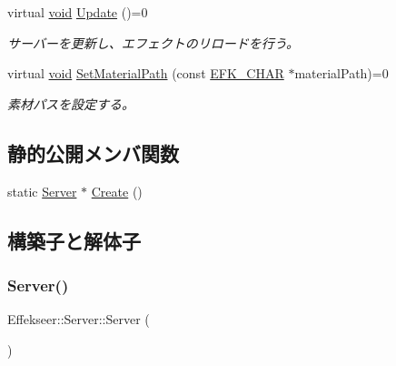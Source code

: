 \begin{DoxyCompactItemize}
virtual \mbox{\hyperlink{namespace_effekseer_ab34c4088e512200cf4c2716f168deb56}{void}} \mbox{\hyperlink{class_effekseer_1_1_server_af841f04fb41ed36b888cb2f89c4c0771}{Update}} ()=0
\begin{DoxyCompactList}\small\item\em サーバーを更新し、エフェクトのリロードを行う。 \end{DoxyCompactList}\item 
virtual \mbox{\hyperlink{namespace_effekseer_ab34c4088e512200cf4c2716f168deb56}{void}} \mbox{\hyperlink{class_effekseer_1_1_server_a4c0d31a5fd39184615179157a6929296}{Set\+Material\+Path}} (const \mbox{\hyperlink{_effekseer_8h_a50b026abea014b47854bcd835b3b6233}{E\+F\+K\+\_\+\+C\+H\+AR}} $\ast$material\+Path)=0
\begin{DoxyCompactList}\small\item\em 素材パスを設定する。 \end{DoxyCompactList}\end{DoxyCompactItemize}
\subsection*{静的公開メンバ関数}
\begin{DoxyCompactItemize}
\item 
static \mbox{\hyperlink{class_effekseer_1_1_server}{Server}} $\ast$ \mbox{\hyperlink{class_effekseer_1_1_server_a010be3e29a3551b3f2bf058b593c3eb0}{Create}} ()
\end{DoxyCompactItemize}


\subsection{構築子と解体子}
\mbox{\label{class_effekseer_1_1_server_af6f7a1893fb9dfe2d65a9288698e3f5a}} 
\subsubsection{\texorpdfstring{Server()}{Server()}}
{\footnotesize\ttfamily Effekseer\+::\+Server\+::\+Server (\begin{DoxyParamCaption}{ }\end{DoxyParamCaption})\hspace{0.3cm}{\ttfamily [inline]}}

\mbox{\label{class_effekseer_1_1_server_a492364188996ee80d8baa9cba8e443d3}} 

